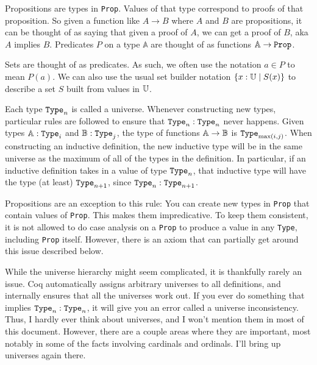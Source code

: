 \documentclass[../../math.tex]{subfiles}
\begin{document}
Propositions are types in \verb|Prop|.  Values of that type correspond to proofs
of that proposition.  So given a function like $A \rightarrow B$ where $A$ and
$B$ are propositions, it can be thought of as saying that given a proof of $A$,
we can get a proof of $B$, aka $A$ implies $B$.  Predicates $P$ on a type
$\mathbb A$ are thought of as functions $\mathbb A \rightarrow \vtt{Prop}$.

Sets are thought of as predicates.  As such, we often use the notation $a \in P$
to mean $P(a)$.  We can also use the usual set builder notation $\{x : \mathbb{U} \mid
S(x)\}$ to describe a set $S$ built from values in $\mathbb{U}$.

Each type $\verb|Type|_n$ is called a universe.  Whenever constructing new
types, particular rules are followed to ensure that $\verb|Type|_n :
\verb|Type|_n$ never happens.  Given types $\A : \verb|Type|_{i}$ and $\B :
\verb|Type|_{j}$, the type of functions $\mathbb{A} \to \mathbb{B}$ is $\verb|Type|_{\max(i,
j)}$.  When constructing an inductive definition, the new inductive type will be
in the same universe as the maximum of all of the types in the definition.  In
particular, if an inductive definition takes in a value of type $\verb|Type|_n$,
that inductive type will have the type (at least) $\verb|Type|_{n + 1}$, since
$\verb|Type|_n : \verb|Type|_{n + 1}$.

Propositions are an exception to this rule: You can create new types in
\verb|Prop| that contain values of \verb|Prop|.  This makes them impredicative.
To keep them consistent, it is not allowed to do case analysis on a \verb|Prop|
to produce a value in any \verb|Type|, including \verb|Prop| itself.  However,
there is an axiom that can partially get around this issue described below.

While the universe hierarchy might seem complicated, it is thankfully rarely an
issue.  Coq automatically assigns arbitrary universes to all definitions, and
internally ensures that all the universes work out.  If you ever do something
that implies $\verb|Type|_n : \verb|Type|_n$, it will give you an error called a
universe inconsistency.  Thus, I hardly ever think about universes, and I won't
mention them in most of this document.  However, there are a couple areas where
they are important, most notably in some of the facts involving cardinals and
ordinals.  I'll bring up universes again there.
\end{document}
